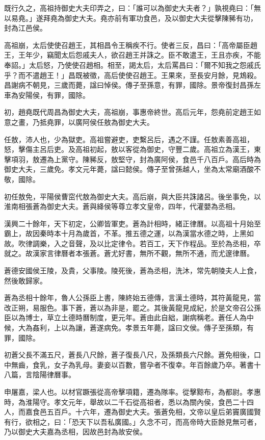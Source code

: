 \begin{pinyinscope}
既行久之，高祖持御史大夫印弄之，曰：「誰可以為御史大夫者？」孰視堯曰：「無以易堯。」遂拜堯為御史大夫。堯亦前有軍功食邑，及以御史大夫從擊陳豨有功，封為江邑侯。

高祖崩，太后使使召趙王，其相昌令王稱疾不行。使者三反，昌曰：「高帝屬臣趙王，王年少，竊聞太后怨戚夫人，欲召趙王并誅之。臣不敢遣王，王且亦疾，不能奉詔。」太后怒，乃使使召趙相。相至，謁太后，太后罵昌曰：「爾不知我之怨戚氏乎？而不遣趙王！」昌既被徵，高后使使召趙王。王果來，至長安月餘，見鴆殺。昌謝病不朝見，三歲而薨，諡曰悼侯。傳子至孫意，有罪，國除。景帝復封昌孫左車為安陽侯，有罪，國除。

初，趙堯既代周昌為御史大夫，高祖崩，事惠帝終世。高后元年，怨堯前定趙王如意之畫，乃抵堯罪，以廣阿侯任敖為御史大夫。

任敖，沛人也，少為獄吏。高祖嘗避吏，吏繫呂后，遇之不謹。任敖素善高祖，怒，擊傷主呂后吏。及高祖初起，敖以客從為御史，守豐二歲。高祖立為漢王，東擊項羽，敖遷為上黨守。陳豨反，敖堅守，封為廣阿侯，食邑千八百戶。高后時為御史大夫，三歲免。孝文元年薨，諡曰懿侯。傳子至曾孫越人，坐為太常廟酒酸不敬，國除。

初任敖免，平陽侯曹窋代敖為御史大夫。高后崩，與大臣共誅諸呂。後坐事免，以淮南相張蒼為御史大夫。蒼與絳侯等尊立孝文皇帝，四年，代灌嬰為丞相。

漢興二十餘年，天下初定，公卿皆軍吏。蒼為計相時，緒正律曆。以高祖十月始至霸上，故因秦時本十月為歲首，不革。推五德之運，以為漢當水德之時，上黑如故。吹律調樂，入之音聲，及以比定律令。若百工，天下作程品。至於為丞相，卒就之。故漢家言律曆者本張蒼。蒼尤好書，無所不觀，無所不通，而尤邃律曆。

蒼德安國侯王陵，及貴，父事陵。陵死後，蒼為丞相，洗沐，常先朝陵夫人上食，然後敢歸家。

蒼為丞相十餘年，魯人公孫臣上書，陳終始五德傳，言漢土德時，其符黃龍見，當改正朔，易服色。事下蒼，蒼以為非是，罷之。其後黃龍見成紀，於是文帝召公孫臣以為博士，草立土德時曆制度，更元年。蒼由此自絀，謝病稱老。蒼任人為中候，大為姦利，上以為讓，蒼遂病免。孝景五年薨，諡曰文侯。傳子至孫類，有罪，國除。

初蒼父長不滿五尺，蒼長八尺餘，蒼子復長八尺，及孫類長六尺餘。蒼免相後，口中無齒，食乳，女子為乳母。妻妾以百數，嘗孕者不復幸。年百餘歲乃卒。著書十八篇，言陰陽律曆事。

申屠嘉，梁人也。以材官蹶張從高帝擊項籍，遷為隊率。從擊黥布，為都尉。孝惠時，為淮陽守。孝文元年，舉故以二千石從高祖者，悉以為關內侯，食邑二十四人，而嘉食邑五百戶。十六年，遷為御史大夫。張蒼免相，文帝以皇后弟竇廣國賢有行，欲相之，曰：「恐天下以吾私廣國。」久念不可，而高帝時大臣餘見無可者，乃以御史大夫嘉為丞相，因故邑封為故安侯。


\end{pinyinscope}
